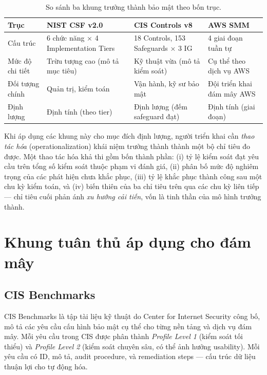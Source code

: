 \begin{table}[!htb]
\centering
\caption{So sánh ba khung trưởng thành bảo mật theo bốn trục.}
\label{tab:maturity-compare}
\small
\begin{tabularx}{\textwidth}{p{2.6cm} X X X}
\toprule
\textbf{Trục} & \textbf{NIST CSF v2.0} & \textbf{CIS Controls v8} & \textbf{AWS SMM} \\
\midrule
Cấu trúc & 6 chức năng × 4 Implementation Tiers & 18 Controls, 153 Safeguards × 3 IG & 4 giai đoạn tuần tự \\
Mức độ chi tiết & Trừu tượng cao (mô tả mục tiêu) & Kỹ thuật vừa (mô tả kiểm soát) & Cụ thể theo dịch vụ AWS \\
Đối tượng chính & Quản trị, kiểm toán & Vận hành, kỹ sư bảo mật & Đội triển khai đám mây AWS \\
Định lượng & Định tính (theo tier) & Định lượng (đếm safeguard đạt) & Định tính (giai đoạn) \\
\bottomrule
\end{tabularx}
\end{table}

Khi áp dụng các khung này cho mục đích định lượng, người triển khai cần \textit{thao tác hóa} (operationalization) khái niệm trưởng thành thành một bộ chỉ tiêu đo được. Một thao tác hóa khả thi gồm bốn thành phần: (i) tỷ lệ kiểm soát đạt yêu cầu trên tổng số kiểm soát thuộc phạm vi đánh giá, (ii) phân bố mức độ nghiêm trọng của các phát hiện chưa khắc phục, (iii) tỷ lệ khắc phục thành công sau một chu kỳ kiểm toán, và (iv) biến thiên của ba chỉ tiêu trên qua các chu kỳ liên tiếp --- chỉ tiêu cuối phản ánh \textit{xu hướng cải tiến}, vốn là tinh thần của mô hình trưởng thành.

\section{Khung tuân thủ áp dụng cho đám mây}
\label{sec:compliance}

\subsection{CIS Benchmarks}
\label{subsec:cis-benchmarks}

CIS Benchmarks \cite{cis_aws_foundations} là tập tài liệu kỹ thuật do Center for Internet Security công bố, mô tả các yêu cầu cấu hình bảo mật cụ thể cho từng nền tảng và dịch vụ đám mây. Mỗi yêu cầu trong CIS được phân thành \textit{Profile Level 1} (kiểm soát tối thiểu) và \textit{Profile Level 2} (kiểm soát chuyên sâu, có thể ảnh hưởng usability). Mỗi yêu cầu có ID, mô tả, audit procedure, và remediation steps --- cấu trúc dữ liệu thuận lợi cho tự động hóa.

